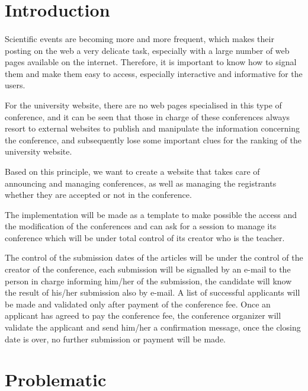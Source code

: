 \section{ Introduction}
	\paragraph{}
	Scientific events are becoming more and more frequent, which makes their posting on the web a very delicate task, especially with a large number of web pages available on the internet. Therefore, it is important to know how to signal them and make them easy to access, especially interactive and informative for the users.
	
	For the university website, there are no web pages specialised in this type of conference, and it can be seen that those in charge of these conferences always resort to external websites to publish and manipulate the information concerning the conference, and subsequently lose some important clues for the ranking of the university website.
	
	Based on this principle, we want to create a website that takes care of announcing and managing conferences, as well as managing the registrants whether they are accepted or not in the conference.
	
	The implementation will be made as a template to make possible the access and the modification of the conferences and can ask for a session to manage its conference which will be under total control of its creator who is the teacher.
	
	The control of the submission dates of the articles will be under the control of the creator of the conference, each submission will be signalled by an e-mail to the person in charge informing him/her of the submission, the candidate will know the result of his/her submission also by e-mail.
	A list of successful applicants will be made and validated only after payment of the conference fee. Once an applicant has agreed to pay the conference fee, the conference organizer will validate the applicant and send him/her a confirmation message, once the closing date is over, no further submission or payment will be made.
\section{Problematic}
